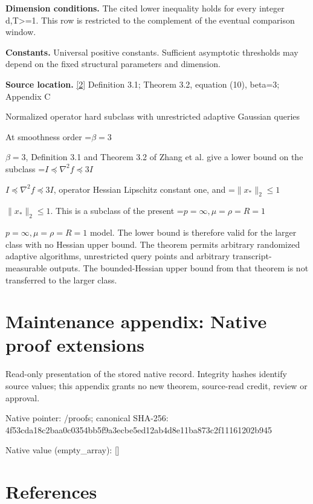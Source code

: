 \documentclass[10pt,a4paper]{article}
\newcommand{\AtlasMath}[1]{\par\begingroup\centering\setbox0=\hbox{$\displaystyle #1$}\ifdim\wd0>1.4\linewidth\typeout{ATLAS WIDE FORMULA: \the\wd0}\fi\ifdim\wd0>\linewidth\resizebox{\linewidth}{!}{\box0}\else\box0\fi\par\endgroup}
\newcommand{\AtlasInlineMath}[1]{\begingroup\setbox0=\hbox{$#1$}\ifdim\wd0>.4\linewidth\endgroup\AtlasMath{#1}\else\endgroup$#1$\fi}
\begin{document}
\textbf{Dimension conditions.} The cited lower inequality holds for every integer d,T>=1. This row is restricted to the complement of the eventual comparison window.



\textbf{Constants.} Universal positive constants. Sufficient asymptotic thresholds may depend on the fixed structural parameters and dimension.



\textbf{Source location.} \href{https://arxiv.org/html/2610.00276v2}{[2]} Definition 3.1; Theorem 3.2, equation (10), beta=3; Appendix C



Normalized operator hard subclass with unrestricted adaptive Gaussian queries



At smoothness order \AtlasInlineMath{\beta=3}, Definition 3.1 and Theorem 3.2 of Zhang et al. give a lower bound on the subclass \AtlasInlineMath{I\preceq\nabla^2 f\preceq3I}, operator Hessian Lipschitz constant one, and \AtlasInlineMath{\|x_*\|_2\le1}. This is a subclass of the present \AtlasInlineMath{p=\infty,\mu=\rho=R=1} model. The lower bound is therefore valid for the larger class with no Hessian upper bound. The theorem permits arbitrary randomized adaptive algorithms, unrestricted query points and arbitrary transcript-measurable outputs. The bounded-Hessian upper bound from that theorem is not transferred to the larger class.



\section{Maintenance appendix: Native proof extensions}


Read-only presentation of the stored native record. Integrity hashes identify source values; this appendix grants no new theorem, source-read credit, review or approval.



Native pointer: /proofs; canonical SHA-256: 4f53cda18c2baa0c0354bb5f\allowbreak{}9a3ecbe5ed12ab4d8e11ba87\allowbreak{}3c2f11161202b945



Native value (empty\_array): []



\section{References}
\end{document}
